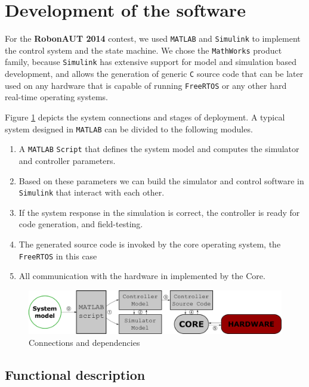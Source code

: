 \section{Development of the software}


For the \textbf{RobonAUT 2014} contest, we used \verb!MATLAB! and \verb!Simulink! to implement the control system and the state machine. We chose the \verb!MathWorks! product family, because \verb!Simulink! has extensive support for model and simulation based development, and allows the generation of generic \verb!C! source code that can be later used on any hardware that is capable of running \verb!FreeRTOS! or any other hard real-time operating systems.

Figure \ref{fig:architecture} depicts the system connections and stages of deployment. A typical system designed in \verb!MATLAB! can be divided to the following modules.

\begin{enumerate}
\item A \verb!MATLAB! \verb!Script! that defines the system model and computes the simulator and controller parameters.
\item Based on these parameters we can build the simulator and control software in \verb!Simulink! that interact with each other.
\item If the system response in the simulation is correct, the controller is ready for code generation, and field-testing.
\item The generated source code is invoked by the core operating system, the \verb!FreeRTOS! in this case
\item All communication with the hardware in implemented by the Core.
\end{enumerate}

\begin{figure}[!ht]
    \centering
    \includegraphics[width=\linewidth]{img/architecture}
    \caption{Connections and dependencies}
    \label{fig:architecture}
\end{figure}

\subsection{Functional description}

